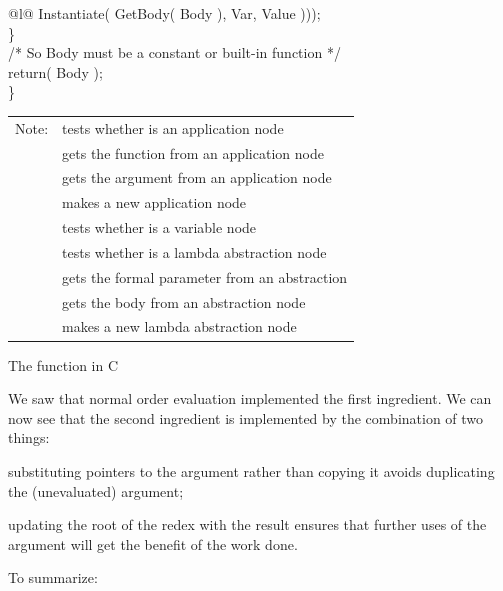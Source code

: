 {\begin{mlcoded}
\begin{tabular}{@{}l@{}}
            \qquad \phantom{return( MakeLam( }Instantiate( GetBody( Body ), Var, Value ))); \\
            \quad \} \\
            /* So Body must be a constant or built-in function */ \\
            \quad return( Body ); \\
            \} \\[6pt]
            \begin{tabular}{@{}l@{\quad}l@{}}
                Note: & \ml{IsAp(B)} tests whether \ml{B} is an application node \\
                & \ml{GetFun(B)} gets the function from an application node \\
                & \ml{GetArg(B)} gets the argument from an application node \\
                & \ml{MakeAp(F,A)} makes a new application node \\[4pt]
                & \ml{IsVar(B)} tests whether \ml{B} is a variable node \\[4pt]
                & \ml{IsLam(B)} tests whether \ml{B} is a lambda abstraction node \\
                & \ml{GetVar(B)} gets the formal parameter from an abstraction \\
                & \ml{GetBody(B)} gets the body from an abstraction node \\
                & \ml{MakeLam(V,B)} makes a new lambda abstraction node \\
            \end{tabular}
        \end{tabular}
    \end{mlcoded}
}{The  function in C}

\noindent We saw that normal order evaluation implemented the first ingredient. We
can now see that the second ingredient is implemented by the combination of
two things:

\begin{numbered}
    \item substituting pointers to the argument rather than copying it avoids
    duplicating the (unevaluated) argument;
    \item updating the root of the redex with the result ensures that further uses of
    the argument will get the benefit of the work done.
\end{numbered}

\noindent To summarize:


